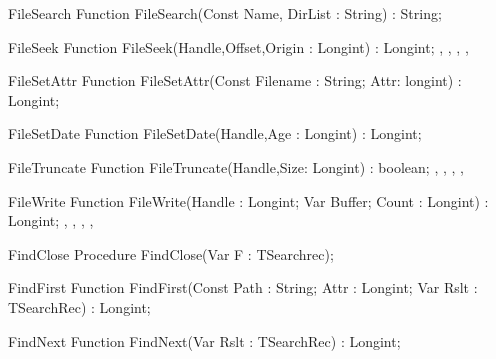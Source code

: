  
\begin{function}{FileSearch}
\Declaration
Function FileSearch(Const Name, DirList : String) : String;
\Description
\Errors
\SeeAlso
\end{function}

 
\begin{function}{FileSeek}
\Declaration
Function FileSeek(Handle,Offset,Origin : Longint) : Longint;
\Description
\Errors
\SeeAlso
{}, , , 
, 
\end{function}

 
\begin{function}{FileSetAttr}
\Declaration
Function FileSetAttr(Const Filename : String; Attr: longint) : Longint;
\Description
\Errors
\SeeAlso
\end{function}

 
\begin{function}{FileSetDate}
\Declaration
Function FileSetDate(Handle,Age : Longint) : Longint;
\Description
\Errors
\SeeAlso
\end{function}

 
\begin{function}{FileTruncate}
\Declaration
Function FileTruncate(Handle,Size: Longint) : boolean;
\Description
\Errors
\SeeAlso
{}, , , 
, 
\end{function}

 
\begin{function}{FileWrite}
\Declaration
Function FileWrite(Handle : Longint; Var Buffer; Count : Longint) : Longint;
\Description
\Errors
\SeeAlso
{}, , 
, , 
\end{function}

 
\begin{procedure}{FindClose}
\Declaration
Procedure FindClose(Var F : TSearchrec);
\Description
\Errors
\SeeAlso
\end{procedure}

 
\begin{function}{FindFirst}
\Declaration
Function FindFirst(Const Path : String; Attr : Longint; Var Rslt : TSearchRec) : Longint;
\Description
\Errors
\SeeAlso
\end{function}

 
\begin{function}{FindNext}
\Declaration
Function FindNext(Var Rslt : TSearchRec) : Longint;
\Description
\Errors
\SeeAlso
\end{function}

